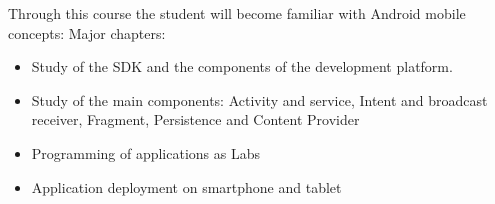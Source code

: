 Through this course the student will become familiar with Android mobile concepts:
Major chapters:
\begin{itemize}
    \item Study of the SDK and the components of the development platform.
    \item Study of the main components: Activity and service, Intent and broadcast receiver, Fragment, Persistence and Content Provider
    \item Programming of applications as Labs
    \item Application deployment on smartphone and tablet
\end{itemize}
